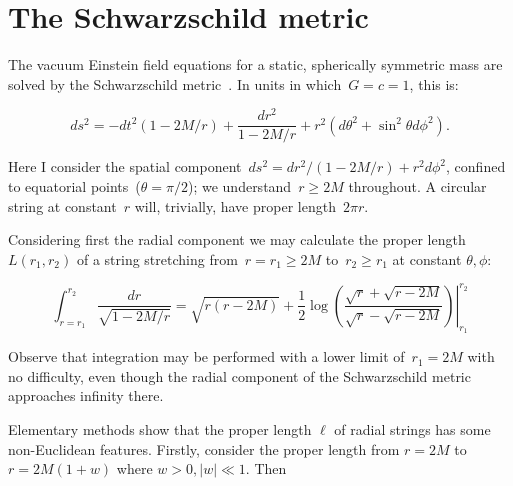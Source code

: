 \documentclass{ws-tpe}
\begin{document}
\section{The Schwarzschild metric}

The vacuum Einstein field equations for a static, spherically
symmetric mass are solved by the Schwarzschild
metric~\cite{schwarzschild1916}.  In units in which~$G=c=1$, this is:

\begin{equation}\label{schwarzschild}
ds^2= -dt^2\left(1-2M/r\right) +\frac{dr^2}{1-2M/r} + r^2\left(d\theta^2 + \sin^2\theta d\phi^2\right).
\end{equation}

\noindent Here I consider the spatial component~$ds^2=
dr^2/\left(1-2M/r\right) + r^2d\phi^2$, confined to equatorial
points~($\theta=\pi/2$); we understand~$r\geqslant 2M$ throughout.  A
circular string at constant~$r$ will, trivially, have proper
length~$2\pi r$.

Considering first the radial component we may calculate the
proper length $L\left(r_1,r_2\right)$ of a string stretching
from~$r=r_1\geqslant 2M$ to~$r_2\geqslant r_1$ at constant $\theta,\phi$:



\begin{equation}\label{radial_string_length}
  \int_{r=r_1}^{r_2}\frac{dr}{\sqrt{1-2M/r}}=
  \left.
  \sqrt{r(r-2M)} +\frac{1}{2}\log\left(
  \frac{\sqrt{r}+\sqrt{r-2M}}{\sqrt{r}-\sqrt{r-2M}}\right)
  \right|_{r_1}^{r_2}
  \end{equation}

Observe that integration may be performed with a lower limit
of~$r_1=2M$ with no difficulty, even though the radial component of the
Schwarzschild metric approaches infinity there.

Elementary methods show that the proper length $\ell$ of radial
strings has some non-Euclidean features.  Firstly, consider the proper
length from $r=2M$ to $r=2M(1+w)$ where $w>0, \left|w\right|\ll 1$.
Then

\end{document}
